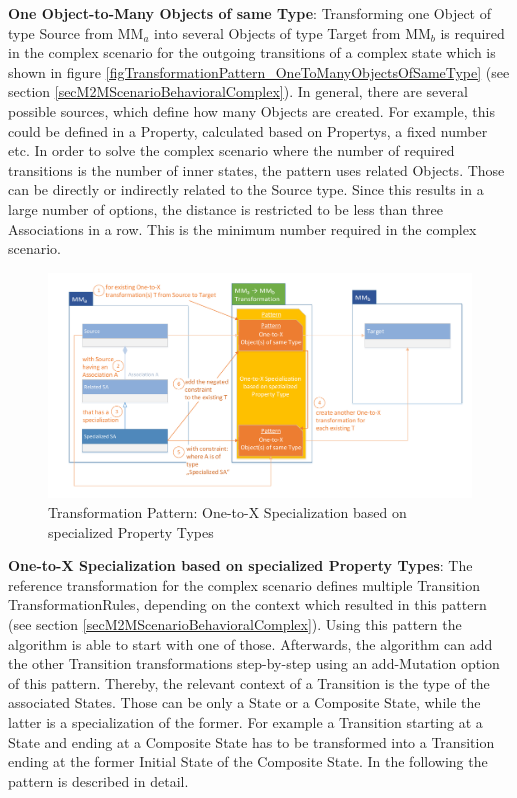 \textbf{One Object-to-Many Objects of same Type}: Transforming one \gls{Object} of type Source from MM$_a$ into several \glspl{Object} of type Target from MM$_b$ is required in the complex scenario for the outgoing transitions of a complex state which is shown in figure \ref{figTransformationPattern_OneToManyObjectsOfSameType} (see section \ref{secM2MScenarioBehavioralComplex}). In general, there are several possible sources, which define how many \glspl{Object} are created. For example, this could be defined in a \gls{Property}, calculated based on \glspl{Property}, a fixed number etc. In order to solve the complex scenario where the number of required transitions is the number of inner states, the pattern uses related \glspl{Object}. Those can be directly or indirectly related to the Source type. Since this results in a large number of options, the distance is restricted to be less than three \glspl{Association} in a row. This is the minimum number required in the complex scenario.
  
\begin{figure}[!ht]
	\centering
	\includegraphics[scale=0.48, trim=0cm 0cm 0cm 0cm, clip=true]{Images/TransformationPattern_OneToXSpecializationBasedOnSpecializedPropertyTypes.pdf} 
	\caption{Transformation Pattern: One-to-X Specialization based on specialized Property Types}
	\label{figTransformationPattern_OneToXSpecializationBasedOnSpecializedPropertyTypes}
\end{figure} 
 
\textbf{One-to-X Specialization based on specialized Property Types}: The reference transformation for the complex scenario defines multiple Transition \glspl{TransformationRule}, depending on the context which resulted in this pattern (see section \ref{secM2MScenarioBehavioralComplex}). Using this pattern the algorithm is able to start with one of those. Afterwards, the algorithm can add the other Transition transformations step-by-step using an add-\gls{Mutation} option of this pattern. Thereby, the relevant context of a Transition is the type of the associated States. Those can be only a State or a Composite State, while the latter is a specialization of the former. For example a Transition starting at a State and ending at a Composite State has to be transformed into a Transition ending at the former Initial State of the Composite State. In the following the pattern is described in detail.

